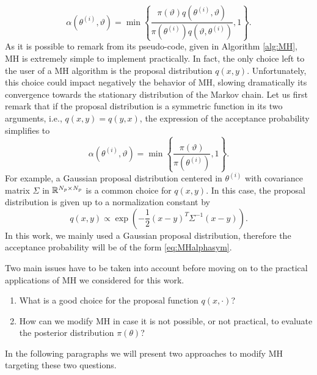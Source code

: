 \begin{equation}\label{eq:MHalpha}
	\alpha(\theta^{(i)}, \vartheta) = \min\left\{\frac{\pi(\vartheta)q(\theta^{(i)}, \vartheta)}{\pi(\theta^{(i)})q(\vartheta, \theta^{(i)})}, 1\right\}.
\end{equation}
As it is possible to remark from its pseudo-code, given in Algorithm \ref{alg:MH}, MH is extremely simple to implement practically. In fact, the only choice left to the user of a MH algorithm is the proposal distribution $q(x,y)$. Unfortunately, this choice could impact negatively the behavior of MH, slowing dramatically its convergence towards the stationary distribution of the Markov chain. Let us first remark that if the proposal distribution is a symmetric function in its two arguments, i.e., $q(x, y) = q(y, x)$,  the expression of the acceptance probability simplifies to
\begin{equation}\label{eq:MHalphasym}
	\alpha(\theta^{(i)}, \vartheta) = \min\left\{\frac{\pi(\vartheta)}{\pi(\theta^{(i)})}, 1\right\}.
\end{equation}
For example, a Gaussian proposal distribution centered in $\theta^{(i)}$ with covariance matrix $\Sigma$ in $\mathbb{R}^{N_p\times N_p}$ is a common choice for $q(x, y)$. In this case, the proposal distribution is given up to a normalization constant by
\begin{equation}\label{eq:gaussianProp}
	q(x, y) \propto \exp(-\frac{1}{2}(x - y)^T\Sigma^{-1}(x - y)).
\end{equation}
In this work, we mainly used a Gaussian proposal distribution, therefore the acceptance probability will be of the form \eqref{eq:MHalphasym}. 

Two main issues have to be taken into account before moving on to the practical applications of MH we considered for this work.
\begin{enumerate}
	\item What is a good choice for the proposal function $q(x, \cdot)$?
	\item How can we modify MH in case it is not possible, or not practical, to evaluate the posterior distribution $\pi(\theta)$?
\end{enumerate}
In the following paragraphs we will present two approaches to modify MH targeting these two questions. 

